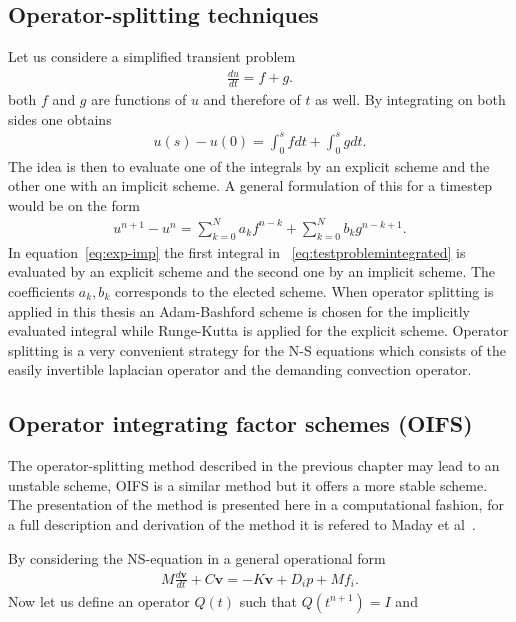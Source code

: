 \subsection{Operator-splitting techniques }
Let us considere a simplified transient problem 
\begin{align}
    \frac{du}{dt} = f + g.
    \label{eq:testproblem}
\end{align}
both $f$ and $g$ are functions of $u$ and therefore of $t$ as well. By integrating on both sides one obtains
\begin{align}
    u(s) - u(0) = \int_0^s f dt + \int_0^s g dt.
    \label{eq:testproblemintegrated}
\end{align}
The idea is then to evaluate one of the integrals by an explicit scheme and the other one with an implicit scheme.
A general formulation of this for a timestep would be on the form 
\begin{align}
    u^{n+1}-u^{n} = \sum_{k = 0}^{N} a_k f^{n-k}+\sum_{k = 0}^{N} b_k g^{n-k+1}.
    \label{eq:exp-imp}
\end{align}
In equation~\ref{eq:exp-imp} the first integral in ~\ref{eq:testproblemintegrated} is evaluated by 
an explicit scheme and the second one by an implicit scheme. The coefficients $a_k,b_k$ corresponds to 
the elected scheme. When operator splitting is applied in this thesis an Adam-Bashford scheme is 
chosen for the implicitly evaluated integral while Runge-Kutta is applied for the explicit scheme. 
Operator splitting is a very convenient strategy for 
the N-S equations which consists of the easily invertible laplacian operator 
and the demanding convection operator. 



\subsection{Operator integrating factor schemes (OIFS)}
The operator-splitting method described in the previous chapter may lead to an unstable scheme,
OIFS is a similar method but it offers a more stable scheme. The presentation of the method 
is presented here in a computational fashion, for a full description and derivation of the method 
it is refered to Maday et al~\cite{raey}.

By considering the NS-equation in a general operational form 
\begin{align}
    M\frac{d \mathbf{v}}{dt} + C\mathbf{v} = -K\mathbf{v} +D_i p +Mf_i.
    \label{eq:NSoperator}
\end{align}
Now let us define an operator $Q(t)$ such that $Q(t^{n+1}) = I$ and 

